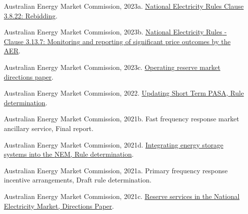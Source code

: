 \documentclass[12pt,a4paper,]{report}
\newlength{\cslhangindent}
\newenvironment{CSLReferences}[2] %
 {%
  \setlength{\parindent}{0pt}
  \ifodd #1 \everypar{\setlength{\hangindent}{\cslhangindent}}\ignorespaces\fi
  \ifnum #2 > 0
  \setlength{\parskip}{#2\baselineskip}
  \fi
 }%
 {}
\begin{document}
\begin{CSLReferences}{1}{0}
\leavevmode{}%
Australian Energy Market Commission, 2023a.
\href{https://energy-rules.aemc.gov.au/ner/477/272296\#3.8.22}{National
{Electricity Rules Clause} 3.8.22: {Rebidding}}.

\leavevmode{}%
Australian Energy Market Commission, 2023b.
\href{https://energy-rules.aemc.gov.au/ner/477/272353\#3.13.7}{National
{Electricity Rules} - {Clause} 3.13.7: {Monitoring} and reporting of
significant price outcomes by the {AER}}.

\leavevmode{}%
Australian Energy Market Commission, 2023c.
\href{https://www.aemc.gov.au/sites/default/files/2023-08/directions_paper_2023_0.pdf}{Operating
reserve market directions paper}.

\leavevmode{}%
Australian Energy Market Commission, 2022.
\href{https://www.aemc.gov.au/sites/default/files/2022-05/ERC0332\%20-\%20Updating\%20Short\%20Term\%20PASA\%20-\%20Final\%20determination.pdf}{Updating
{Short Term PASA}, {Rule} determination}.

\leavevmode{}%
Australian Energy Market Commission, 2021b. Fast frequency response
market ancillary service, {Final} report.

\leavevmode{}%
Australian Energy Market Commission, 2021d.
\href{https://www.aemc.gov.au/sites/default/files/2021-12/1._final_determination_-_integrating_energy_storage_systems_into_the_nem.pdf}{Integrating
energy storage systems into the {NEM}, {Rule} determination}.

\leavevmode{}%
Australian Energy Market Commission, 2021a. Primary frequency response
incentive arrangements, {Draft} rule determination.

\leavevmode{}%
Australian Energy Market Commission, 2021c.
\href{https://www.aemc.gov.au/sites/default/files/2021-01/Reserve\%20services\%20directions\%20paper\%20-\%205.01.2021\%20-\%20FINAL.pdf}{Reserve
services in the {National Electricity Market}, {Directions Paper}}.


\end{CSLReferences}
\end{document}
